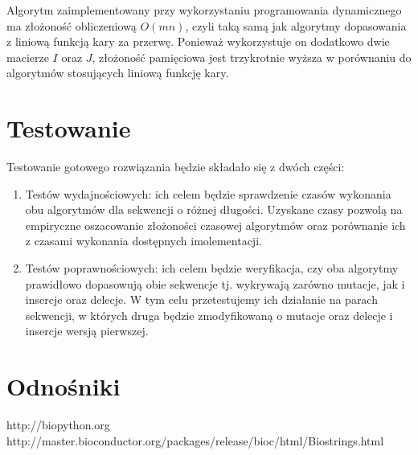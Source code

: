 \documentclass[a4paper,10pt]{article}
\begin{document}
	
	Algorytm zaimplementowany przy wykorzystaniu programowania dynamicznego ma złożoność obliczeniową $O(mn)$, czyli taką samą jak algorytmy dopasowania z liniową funkcją kary za przerwę. Ponieważ wykorzystuje on dodatkowo dwie macierze $I$ oraz $J$, złożoność pamięciowa jest trzykrotnie wyższa w porównaniu do algorytmów stosujących liniową funkcję kary.

	\section{Testowanie}

	Testowanie gotowego rozwiązania będzie składało się z dwóch części:
	\begin{enumerate}
		\item Testów wydajnościowych: ich celem będzie sprawdzenie czasów wykonania obu algorytmów dla sekwencji o różnej długości. Uzyskane czasy pozwolą na empiryczne oszacowanie złożoności czasowej algorytmów oraz porównanie ich z czasami wykonania dostępnych imolementacji.
		\item Testów poprawnościowych: ich celem będzie weryfikacja, czy oba algorytmy prawidłowo dopasowują obie sekwencje tj. wykrywają zarówno mutacje, jak i insercje oraz delecje. W tym celu przetestujemy ich działanie na parach sekwencji, w których druga będzie zmodyfikowaną o mutacje oraz delecje i insercje wersją pierwszej.
	\end{enumerate}

	\section{Odnośniki}
	
	\begin{thebibliography}{99}
		 http://biopython.org
		 http://master.bioconductor.org/packages/release/bioc/html/Biostrings.html
	\end{thebibliography}
\end{document}
